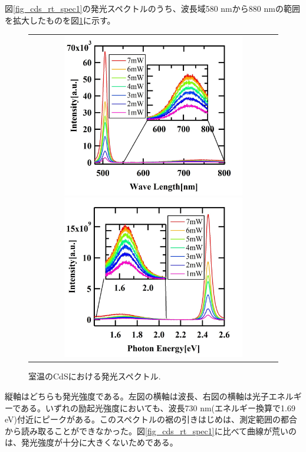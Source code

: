 \documentclass[11pt,a4j]{jsarticle}
\begin{document}
図\ref{fig_cds_rt_spec1}の発光スペクトルのうち、波長域580 nmから880 nmの範囲を拡大したものを図\ref{fig_cds_imp_spec1}に示す。

\newpage
\begin{figure}[ht]
 \centering
 \begin{tabular}{c}

  \begin{minipage}{0.5\hsize}

   \includegraphics[clip,width=8cm]{start2_CdS_imp_Spectrum_wav.jpg}
  \end{minipage}

  \begin{minipage}{0.5\hsize}
   \centering
   \includegraphics[clip,width=8cm]{start2_CdS_imp_Spectrum_eV.jpg}
  \end{minipage}
 \end{tabular}
 \caption{室温のCdSにおける発光スペクトル.}
 \label{fig_cds_imp_spec1}

\end{figure}

縦軸はどちらも発光強度である。左図の横軸は波長、右図の横軸は光子エネルギーである。いずれの励起光強度においても、波長730 nm(エネルギー換算で1.69 eV)付近にピークがある。このスペクトルの裾の引きはじめは、測定範囲の都合から読み取ることができなかった。図\ref{fig_cds_rt_spec1}に比べて曲線が荒いのは、発光強度が十分に大きくないためである。
\end{document}
